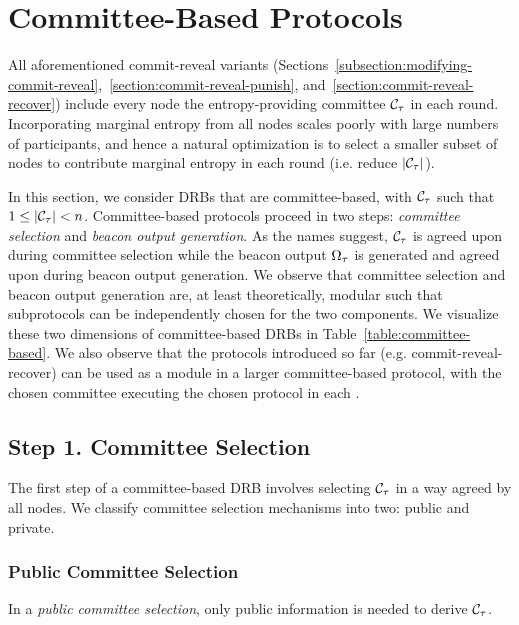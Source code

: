 
\section{Committee-Based Protocols}
\label{section:committee-based}
All aforementioned commit-reveal variants (Sections~\ref{subsection:modifying-commit-reveal},~\ref{section:commit-reveal-punish}, and~\ref{section:commit-reveal-recover}) include every node the entropy-providing committee $\mathcal{C}_\tau$ in each round.
Incorporating marginal entropy from all nodes scales poorly with large numbers of participants, and hence a natural optimization is to select a smaller subset of nodes to contribute marginal entropy in each round (i.e. reduce $|\mathcal{C}_\tau|$).

In this section, we consider DRBs that are committee-based, with $\mathcal{C}_\tau$ such that $1 \leq |\mathcal{C}_\tau| < n$. Committee-based protocols proceed in two steps: \textit{committee selection} and \textit{beacon output generation}. As the names suggest, $\mathcal{C}_\tau$ is agreed upon during committee selection while the beacon output $\Omega_\tau$ is generated and agreed upon during beacon output generation.
We observe that committee selection and beacon output generation are, at least theoretically, modular such that subprotocols can be independently chosen for the two components. We visualize these two dimensions of committee-based DRBs in Table~\ref{table:committee-based}. We also observe that the protocols introduced so far (e.g. commit-reveal-recover) can be used as a module in a larger committee-based protocol, with the chosen committee executing the chosen protocol in each \epoch.

\subsection{Step 1. Committee Selection}
The first step of a committee-based DRB involves selecting $\mathcal{C}_\tau$ in a way agreed by all nodes. We classify committee selection mechanisms into two: public and private.

\subsubsection{Public Committee Selection}
\label{subsubsection:public-committee-selection}
In a \textit{public committee selection}, only public information is needed to derive $\mathcal{C}_\tau$.

